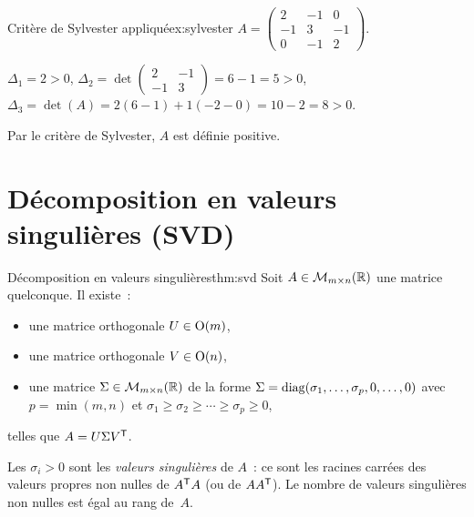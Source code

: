 \begin{example}{Critère de Sylvester appliqué}{ex:sylvester}
  $A = \begin{pmatrix} 2 & -1 & 0 \\ -1 & 3 & -1 \\ 0 & -1 & 2 \end{pmatrix}$.

  $\Delta_1 = 2 > 0$, \quad
  $\Delta_2 = \det\begin{pmatrix} 2 & -1 \\ -1 & 3 \end{pmatrix}
  = 6 - 1 = 5 > 0$, \quad
  $\Delta_3 = \det(A) = 2(6-1) + 1(-2-0) = 10 - 2 = 8 > 0$.

  Par le critère de Sylvester, $A$ est définie positive.
\end{example}

\section{Décomposition en valeurs singulières (SVD)}%
\label{sec:svd}

\begin{theorem}{Décomposition en valeurs singulières}{thm:svd}
  Soit $A \in \mathcal{M}_{m \times n}({\mathbb{R}})$ une matrice
  quelconque.
  Il existe~:
  \begin{itemize}
    \item une matrice orthogonale $U \in \operatorname{O}(m)$,
    \item une matrice orthogonale $V \in \operatorname{O}(n)$,
    \item une matrice $\Sigma \in \mathcal{M}_{m \times n}({\mathbb{R}})$ de la forme
      $\Sigma = \operatorname{diag}(\sigma_1, \ldots, \sigma_p, 0, \ldots, 0)$ avec
      $p = \min(m,n)$ et $\sigma_1 \geq \sigma_2 \geq \cdots \geq
      \sigma_p \geq 0$,
  \end{itemize}
  telles que $A = U \Sigma {V}^{\mathsf{T}}$.

  Les $\sigma_i > 0$ sont les \emph{valeurs singulières}
  de $A$~: ce sont les racines carrées des valeurs propres non nulles de
  ${A}^{\mathsf{T}}A$ (ou de $A{A}^{\mathsf{T}}$). Le nombre de valeurs
  singulières non nulles est égal au rang de~$A$.
\end{theorem}

